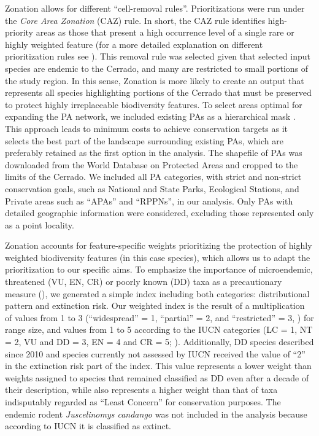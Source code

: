 \documentclass[12pt,openright,oneside,a4paper,english]{abntex2}
\begin{document}
Zonation allows for different “cell-removal rules”. Prioritizations were run under the \textit{Core Area Zonation} (CAZ) rule. In short, the CAZ rule identifies high-priority areas as those that present a high occurrence level of a single rare or highly weighted feature (for a more detailed explanation on different prioritization rules see \citealp{DiMinin2014}). This removal rule was selected given that selected input species are endemic to the Cerrado, and many are restricted to small portions of the study region. In this sense, Zonation is more likely to create an output that represents all species highlighting portions of the Cerrado that must be preserved to protect highly irreplaceable biodiversity features. To select areas optimal for expanding the PA network, we included existing PAs as a hierarchical mask \citep{DiMinin2014}. This approach leads to minimum costs to achieve conservation targets as it selects the best part of the landscape surrounding existing PAs, which are preferably retained as the first option in the analysis. The shapefile of PAs was downloaded from the World Database on Protected Areas \citep{IUCN2020} and cropped to the limits of the Cerrado. We included all PA categories, with strict and non-strict conservation goals, such as National and State Parks, Ecological Stations, and Private areas such as “APAs” and “RPPNs”, in our analysis. Only PAs with detailed geographic information were considered, excluding those represented only as a point locality. 

Zonation accounts for feature-specific weights prioritizing the protection of highly weighted biodiversity features (in this case species), which allows us to adapt the prioritization to our specific aims. To emphasize the importance of microendemic, threatened (VU, EN, CR) or poorly known (DD) taxa as a precautionary measure (\citealp[see][]{Nori2018}), we generated a simple index including both categories: distributional pattern and extinction risk. Our weighted index is the result of a multiplication of values from 1 to 3 (“widespread” = 1, “partial” = 2, and “restricted” = 3, \citealp[see][]{Nogueira2019}) for range size, and values from 1 to 5 according to the IUCN categories  (LC = 1, NT = 2, VU and DD = 3, EN = 4 and CR = 5; \citealp{IUCN2022}). Additionally, DD species described since 2010 and species currently not assessed by IUCN received the value of “2” in the extinction risk part of the index. This value represents a lower weight than weights assigned to species that remained classified as DD even after a decade of their description, while also represents a higher weight than that of taxa indisputably regarded as “Least Concern” for conservation purposes. The endemic rodent \textit{Juscelinomys candango} was not included in the analysis because according to IUCN it is classified as extinct.
\end{document}
